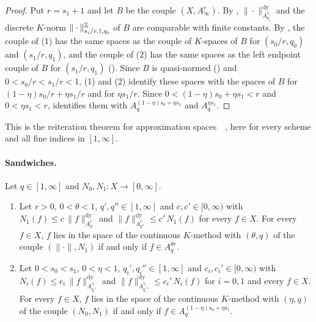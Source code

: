 \begin{proof}
\leanok
Put $r = s_1 + 1$ and let $B$ be the couple $(X, A^r_\infty)$. By
, $\|\cdot\|^{\mathrm{dy}}_{A^{s_i}_{q_i}}$ and the
discrete $K$-norm $\|\cdot\|^{\mathbb{Z}}_{s_i/r, 1, q_i}$ of $B$ are comparable with finite constants.
By , the couple of (1) has the same spaces as the couple of
$K$-spaces of $B$ for $(s_0/r, q_0)$ and $(s_1/r, q_1)$, and the couple of (2) has the same
spaces as the left endpoint couple of $B$ for $(s_1/r, q_1)$
(). Since $B$ is quasi-normed
() and $0 < s_0/r < s_1/r < 1$, 
(1) and (2) identify these spaces with the spaces of $B$ for $(1 - \eta) s_0/r + \eta s_1/r$ and
for $\eta s_1/r$. Since
$0 < (1 - \eta) s_0 + \eta s_1 < r$ and $0 < \eta s_1 < r$,
 identifies them with
$A^{(1-\eta)s_0 + \eta s_1}_q$ and $A^{\eta s_1}_q$.
\end{proof}

This is the reiteration theorem for approximation
spaces~\cite[Chapter~7]{DeVoreLorentz}~\cite{Pietsch, DeVorePopovLNM}, here for every scheme
and all fine indices in
$[1, \infty]$.

\paragraph{Sandwiches.}

\begin{corollary}
\label{cor:approximation-space-sandwich}
\leanok
{}
Let $q \in [1, \infty]$ and $N_0, N_1 : X \to [0, \infty]$.
\begin{enumerate}
  \item Let $r > 0$, $0 < \theta < 1$, $q', q'' \in [1, \infty]$ and $c, c' \in [0, \infty)$
    with $N_1(f) \leq c \, \|f\|^{\mathrm{dy}}_{A^r_{q'}}$ and
    $\|f\|^{\mathrm{dy}}_{A^r_{q''}} \leq c' \, N_1(f)$ for every $f \in X$. For every
    $f \in X$, $f$ lies in the space of the continuous $K$-method with $(\theta, q)$ of the
    couple $(\|\cdot\|, N_1)$ if and only if $f \in A^{\theta r}_q$.
  \item Let $0 < s_0 < s_1$, $0 < \eta < 1$, $q_i', q_i'' \in [1, \infty]$ and
    $c_i, c_i' \in [0, \infty)$ with $N_i(f) \leq c_i \, \|f\|^{\mathrm{dy}}_{A^{s_i}_{q_i'}}$
    and $\|f\|^{\mathrm{dy}}_{A^{s_i}_{q_i''}} \leq c_i' \, N_i(f)$ for $i = 0, 1$ and every
    $f \in X$. For every $f \in X$, $f$ lies in the space of the continuous $K$-method with
    $(\eta, q)$ of the couple $(N_0, N_1)$ if and only if
    $f \in A^{(1-\eta)s_0 + \eta s_1}_q$.
\end{enumerate}
\end{corollary}

